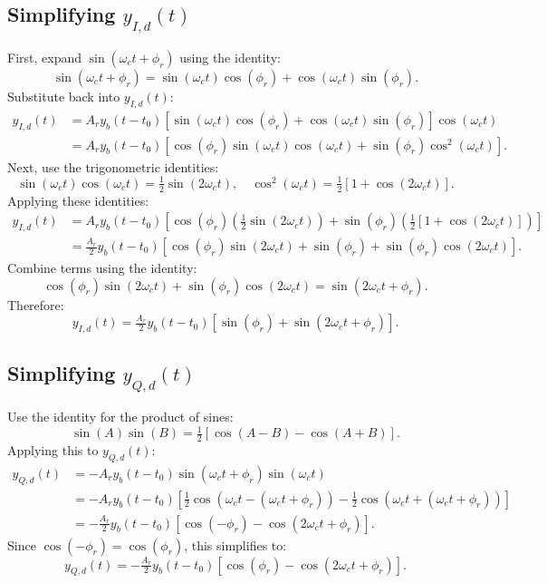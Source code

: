 \documentclass[12pt, a4paper]{article}
\begin{document}
\subsection*{Simplifying \( y_{I,d}(t) \)}
First, expand \(\sin(\omega_c t + \phi_r)\) using the identity:
\[
\sin(\omega_c t + \phi_r) = \sin(\omega_c t) \cos(\phi_r) + \cos(\omega_c t) \sin(\phi_r).
\]
Substitute back into \( y_{I,d}(t) \):
\begin{align*}
y_{I,d}(t) &= A_r y_b(t - t_0) \left[ \sin(\omega_c t) \cos(\phi_r) + \cos(\omega_c t) \sin(\phi_r) \right] \cos(\omega_c t) \\
&= A_r y_b(t - t_0) \left[ \cos(\phi_r) \sin(\omega_c t) \cos(\omega_c t) + \sin(\phi_r) \cos^2(\omega_c t) \right].
\end{align*}
Next, use the trigonometric identities:
\[
\sin(\omega_c t) \cos(\omega_c t) = \tfrac{1}{2} \sin(2\omega_c t), \quad \cos^2(\omega_c t) = \tfrac{1}{2} [1 + \cos(2\omega_c t)].
\]
Applying these identities:
\begin{align*}
y_{I,d}(t) &= A_r y_b(t - t_0) \left[ \cos(\phi_r) \left( \tfrac{1}{2} \sin(2\omega_c t) \right) + \sin(\phi_r) \left( \tfrac{1}{2} [1 + \cos(2\omega_c t)] \right) \right] \\
&= \tfrac{A_r}{2} y_b(t - t_0) \left[ \cos(\phi_r) \sin(2\omega_c t) + \sin(\phi_r) + \sin(\phi_r) \cos(2\omega_c t) \right].
\end{align*}
Combine terms using the identity:
\[
\cos(\phi_r) \sin(2\omega_c t) + \sin(\phi_r) \cos(2\omega_c t) = \sin(2\omega_c t + \phi_r).
\]
Therefore:
\[
y_{I,d}(t) = \tfrac{A_r}{2} y_b(t - t_0) \left[ \sin(\phi_r) + \sin(2\omega_c t + \phi_r) \right].
\]
\subsection*{Simplifying \( y_{Q,d}(t) \)}
Use the identity for the product of sines:
\[
\sin(A) \sin(B) = \tfrac{1}{2} [\cos(A - B) - \cos(A + B)].
\]
Applying this to \( y_{Q,d}(t) \):
\begin{align*}
y_{Q,d}(t) &= -A_r y_b(t - t_0) \sin(\omega_c t + \phi_r) \sin(\omega_c t) \\
&= -A_r y_b(t - t_0) \left[ \tfrac{1}{2} \cos(\omega_c t - (\omega_c t + \phi_r)) - \tfrac{1}{2} \cos(\omega_c t + (\omega_c t + \phi_r)) \right] \\
&= -\tfrac{A_r}{2} y_b(t - t_0) \left[ \cos(-\phi_r) - \cos(2\omega_c t + \phi_r) \right].
\end{align*}
Since \(\cos(-\phi_r) = \cos(\phi_r)\), this simplifies to:
\[
y_{Q,d}(t) = -\tfrac{A_r}{2} y_b(t - t_0) \left[ \cos(\phi_r) - \cos(2\omega_c t + \phi_r) \right].
\]
\end{document}

